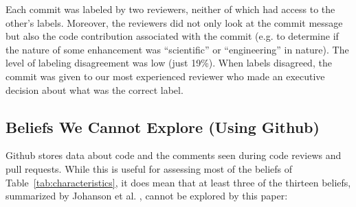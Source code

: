 \documentclass[sigconf,review,anonymous]{acmart}
\begin{document}
 

Each commit was labeled by two reviewers,
neither of which had access to the other's labels. Moreover, the reviewers did not only look at the commit message but also the code contribution associated with the commit (e.g. to determine if the nature of some enhancement was 
``scientific'' or ``engineering'' in nature). The level of
labeling disagreement was low (just 19\%). When labels disagreed, the commit was given to our most experienced reviewer who made an executive decision about what
was the correct label.





 







  







\subsection{Beliefs We Cannot Explore (Using Github)}

Github stores data about code and the comments seen during code reviews and pull requests. While this is useful for assessing most of the beliefs of Table~\ref{tab:characteristics}, it does mean that at least three of the thirteen beliefs, summarized by Johanson et al. \cite{johan18_secs}, cannot be explored by this paper:
\end{document}
